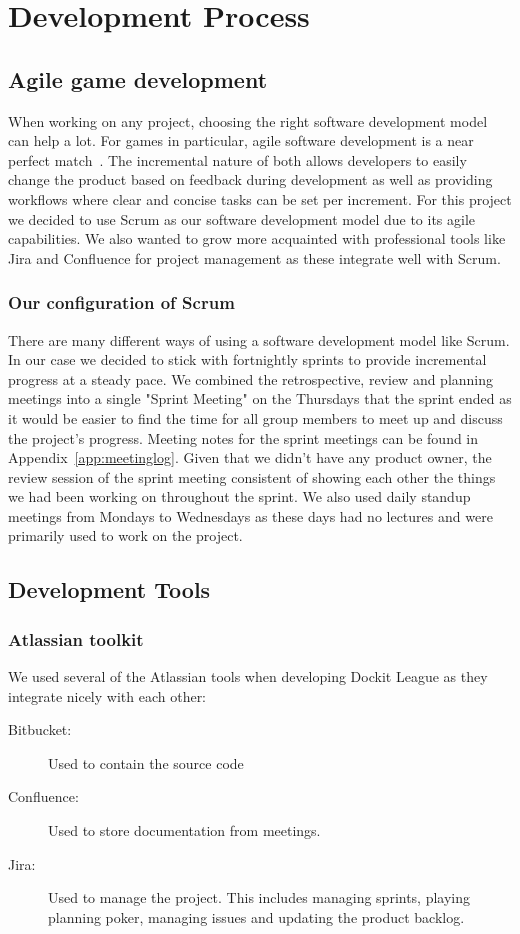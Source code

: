 \chapter{Development Process}
\label{chap:process}
\section{Agile game development}
When working on any project, choosing the right software development model can help a lot. For games in particular, agile software development is a near perfect match~\cite{keith2010agile}. The incremental nature of both allows developers to easily change the product based on feedback during development as well as providing workflows where clear and concise tasks can be set per increment. For this project we decided to use Scrum as our software development model due to its agile capabilities. We also wanted to grow more acquainted with professional tools like Jira and Confluence for project management as these integrate well with Scrum.   

\subsection{Our configuration of Scrum}
There are many different ways of using a software development model like Scrum. In our case we decided to stick with fortnightly sprints to provide incremental progress at a steady pace. We combined the retrospective, review and planning meetings into a single "Sprint Meeting" on the Thursdays that the sprint ended as it would be easier to find the time for all group members to meet up and discuss the project's progress. Meeting notes for the sprint meetings can be found in Appendix~\ref{app:meetinglog}.
Given that we didn't have any product owner, the review session of the sprint meeting consistent of showing each other the things we had been working on throughout the sprint. We also used daily standup meetings from Mondays to Wednesdays as these days had no lectures and were primarily used to work on the project. 

\section{Development Tools}
\subsection{Atlassian toolkit}
We used several of the Atlassian tools when developing Dockit League as they integrate nicely with each other: 
\begin{description}
    \item[Bitbucket: ] Used to contain the source code
    \item[Confluence: ] Used to store documentation from meetings.
    \item[Jira: ] Used to manage the project. This includes managing sprints, playing planning poker, managing issues and updating the product backlog. 
\end{description}

